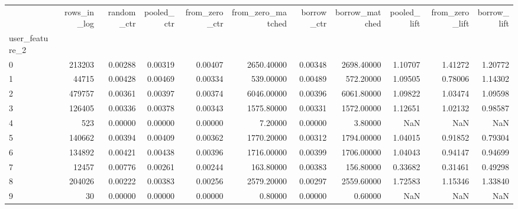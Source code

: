 \begin{tabular}{lrrrrrrrrrr}
\toprule
 & rows\_in\_log & random\_ctr & pooled\_ctr & from\_zero\_ctr & from\_zero\_matched & borrow\_ctr & borrow\_matched & pooled\_lift & from\_zero\_lift & borrow\_lift \\
user\_feature\_2 &  &  &  &  &  &  &  &  &  &  \\
\midrule
0 & 213203 & 0.00288 & 0.00319 & 0.00407 & 2650.40000 & 0.00348 & 2698.40000 & 1.10707 & 1.41272 & 1.20772 \\
1 & 44715 & 0.00428 & 0.00469 & 0.00334 & 539.00000 & 0.00489 & 572.20000 & 1.09505 & 0.78006 & 1.14302 \\
2 & 479757 & 0.00361 & 0.00397 & 0.00374 & 6046.00000 & 0.00396 & 6061.80000 & 1.09822 & 1.03474 & 1.09598 \\
3 & 126405 & 0.00336 & 0.00378 & 0.00343 & 1575.80000 & 0.00331 & 1572.00000 & 1.12651 & 1.02132 & 0.98587 \\
4 & 523 & 0.00000 & 0.00000 & 0.00000 & 7.20000 & 0.00000 & 3.80000 & NaN & NaN & NaN \\
5 & 140662 & 0.00394 & 0.00409 & 0.00362 & 1770.20000 & 0.00312 & 1794.00000 & 1.04015 & 0.91852 & 0.79304 \\
6 & 134892 & 0.00421 & 0.00438 & 0.00396 & 1716.00000 & 0.00399 & 1706.00000 & 1.04043 & 0.94147 & 0.94699 \\
7 & 12457 & 0.00776 & 0.00261 & 0.00244 & 163.80000 & 0.00383 & 156.80000 & 0.33682 & 0.31461 & 0.49298 \\
8 & 204026 & 0.00222 & 0.00383 & 0.00256 & 2579.20000 & 0.00297 & 2559.60000 & 1.72583 & 1.15346 & 1.33840 \\
9 & 30 & 0.00000 & 0.00000 & 0.00000 & 0.80000 & 0.00000 & 0.60000 & NaN & NaN & NaN \\
\bottomrule
\end{tabular}
